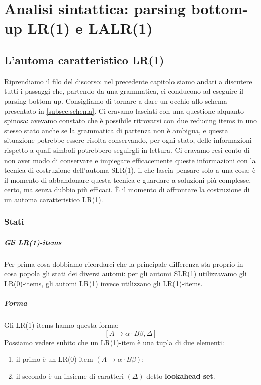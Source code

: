 \documentclass[class=book, crop=false, oneside, 12pt]{standalone}
\begin{document}
\chapter[Parsing bottom-up: LR(1) e LALR(1)]{Analisi sintattica: parsing bottom-up LR(1) e LALR(1)}

\section{L'automa caratteristico LR(1)}
Riprendiamo il filo del discorso: nel precedente capitolo siamo andati a discutere tutti i passaggi che, partendo da una grammatica, ci conducono ad eseguire il parsing bottom-up. Consigliamo di tornare a dare un occhio allo schema presentato in \autoref{subsec:schema}. Ci eravamo lasciati con una questione alquanto spinosa: avevamo constato che è possibile ritrovarsi con due reducing items in uno stesso stato anche se la grammatica di partenza non è ambigua, e questa situazione potrebbe essere risolta conservando, per ogni stato, delle informazioni rispetto a quali simboli potrebbero seguirgli in lettura. Ci eravamo resi conto di non aver modo di conservare e impiegare efficacemente queste informazioni con la tecnica di costruzione dell'automa SLR(1), il che lascia pensare solo a una cosa: è il momento di abbandonare questa tecnica e guardare a soluzioni più complesse, certo, ma senza dubbio più efficaci. È il momento di affrontare la costruzione di un automa caratteristico LR(1).
\subsection{Stati}
\paragraph{Gli LR(1)-items}
Per prima cosa dobbiamo ricordarci che la principale differenza sta proprio in cosa popola gli stati dei diversi automi: per gli automi SLR(1) utilizzavamo gli LR(0)-items, gli automi LR(1) invece utilizzano gli LR(1)-items.
\paragraph{Forma}
Gli LR(1)-items hanno questa forma:
\begin{equation}
    \label{lr0}
    [A \to \alpha \cdot B \beta, \Delta]
\end{equation}
Possiamo vedere subito che un LR(1)-item è una tupla di due elementi:
\begin{enumerate}
    \item il primo è un LR(0)-item \((A \to \alpha \cdot B \beta)\);
    \item il secondo è un insieme di caratteri \((\Delta)\) detto \textbf{lookahead set}.
\end{enumerate}
\end{document}
